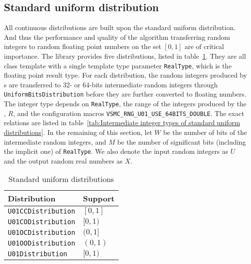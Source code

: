 \subsection{Standard uniform distribution}
\label{sub:Standard uniform distribution}

All continuous distributions are built upon the standard uniform distribution.
And thus the performance and quality of the algorithm transferring random
integers to random floating point numbers on the set $[0, 1]$ are of critical
importance. The library provides five distributions, listed in
table~\ref{tab:Standard uniform distributions}. They are all class template
with a single template type parameter \verb|RealType|, which is the floating
point result type. For each distribution, the random integers produced by
\rng{}s are transferred to 32- or 64-bits intermediate random integers through
\verb|UniformBitsDistribution| before they are further converted to floating
numbers. The integer type depends on \verb|RealType|, the range of the integers
produced by the \rng{}, $R$, and the configuration macros
\verb|VSMC_RNG_U01_USE_64BITS_DOUBLE|. The exact relations are listed in
table~\ref{tab:Intermediate integer types of standard uniform distributions}.
In the remaining of this section, let $W$ be the number of bits of the
intermediate random integers, and $M$ be the number of significant bits
(including the implicit one) of \verb|RealType|. We also denote the input
random integers as $U$ and the output random real numbers as $X$.

\begin{table}
  \begin{tabularx}{\textwidth}{XX}
    \toprule
    Distribution & Support \\
    \midrule
    \verb|U01CCDistribution| & $[0, 1]$ \\
    \verb|U01CODistribution| & $[0, 1)$ \\
    \verb|U01OCDistribution| & $(0, 1]$ \\
    \verb|U01OODistribution| & $(0, 1)$ \\
    \verb|U01Distribution|   & $[0, 1)$ \\
    \bottomrule
  \end{tabularx}
  \caption{Standard uniform distributions}
  \label{tab:Standard uniform distributions}
\end{table}

